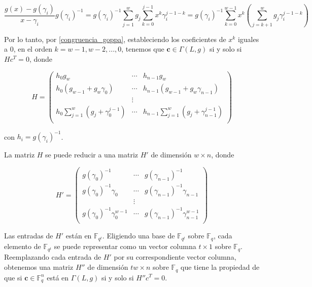 $$\frac{g(x) - g(\gamma_i)}{x - \gamma_i} g(\gamma_i)^{-1} = g(\gamma_i)^{-1} \sum_{j=1}^w g_j \sum_{k=0}^{j-1} x^k \gamma_i^{j-1-k} = g(\gamma_i)^{-1} \sum_{k=0}^{w-1} x^k \left( \sum_{j=k+1}^w g_j \gamma_i^{j-1-k} \right)$$

Por lo tanto, por \eqref{congruencia_goppa}, estableciendo los coeficientes de $x^k$ iguales a $0$, en el orden $k = w - 1, w - 2, ..., 0$, tenemos que $\textbf{c} \in \Gamma(L,g)$ si y solo si $Hc^T = 0$, donde 

\begin{equation}
    H = \left(
        \begin{array}{ccc} 
            h_0 g_w & \cdots & h_{n-1} g_w  \\
            h_0 (g_{w-1} + g_w \gamma_0) & \cdots & h_{n-1} (g_{w-1} + g_w \gamma_{n-1}) \\
            & \vdots & \\
            h_0 \sum_{j=1}^w \left( g_j + \gamma_0^{j-1} \right) & \cdots & h_{n-1} \sum_{j=1}^w \left( g_{j} + \gamma_{n-1}^{j-1} \right) \\
        \end{array}
        \right)
\end{equation}

con $h_i = g(\gamma_i)^{-1}$.

\begin{proposition}
    La matriz $H$ se puede reducir a una matriz $H'$ de dimensión $w \times n$, donde 

    \begin{equation}
        H' = \left(
            \begin{array}{ccc} 
                g(\gamma_0)^{-1} & \cdots & g(\gamma_{n-1})^{-1}  \\
                g(\gamma_0)^{-1} \gamma_0 & \cdots & g(\gamma_{n-1})^{-1} \gamma_{n-1} \\
                & \vdots & \\
                g(\gamma_0)^{-1} \gamma_0^{w-1} & \cdots & g(\gamma_{n-1})^{-1} \gamma_{n-1}^{w-1} \\
            \end{array}
            \right)
    \end{equation}
\end{proposition}

Las entradas de $H'$ están en $\mathbb{F}_{q^t}$. Eligiendo una base de $\mathbb{F}_{q^t}$ sobre $\mathbb{F}_q$, cada elemento de $\mathbb{F}_{q^t}$ se puede representar como un vector columna $t \times 1$ sobre $\mathbb{F}_q$. Reemplazando cada entrada de $H'$ por su correspondiente vector columna, obtenemos una matriz $H''$ de dimensión $tw \times n$ sobre $\mathbb{F}_{q}$ que tiene la propiedad de que si $\textbf{c} \in \mathbb{F}_q^n$ está en $\Gamma(L,g)$ si y solo si $H''c^T = 0$.

